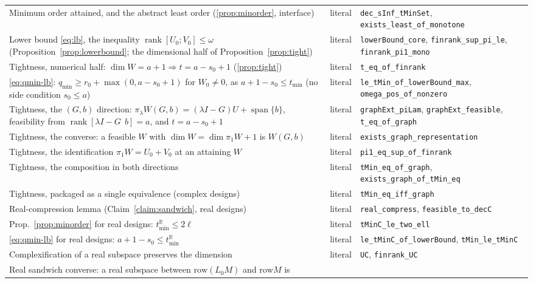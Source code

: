 ﻿\documentclass[journal]{IEEEtran}
\theoremstyle{plainn}
\theoremstyle{remark}
\begin{document}
\begin{table}[!t]
\begin{tabular}{@{}p{}>{\raggedright\arraybackslash}p{}>{\raggedright\arraybackslash}p{}@{}}
Minimum order attained, and the abstract least order (\ref{prop:minorder}, interface) & literal &
\texttt{dec\_sInf\_tMinSet}, \texttt{exists\_least\_of\_monotone} \\
Lower bound \eqref{eq:lb}, the inequality $\operatorname{rank}[U_0;V_0]\le\omega$
(Proposition~\ref{prop:lowerbound}; the dimensional half of Proposition~\ref{prop:tight}) &
literal & \texttt{lowerBound\_core}, \texttt{finrank\_sup\_pi\_le}, \texttt{finrank\_pi1\_mono} \\
Tightness, numerical half: $\dim W=a+1\Rightarrow t=a-s_0+1$ (\ref{prop:tight}) & literal &
\texttt{t\_eq\_of\_finrank} \\
\eqref{eq:qmin-lb}: $q_{\min}\ge r_0+\max(0,a-s_0+1)$ for $W_0\neq0$, as
$a+1-s_0\le t_{\min}$ (no side condition $s_0\le a$) & literal &
\texttt{le\_tMin\_of\_lowerBound\_max}, \texttt{omega\_pos\_of\_nonzero} \\
Tightness, the $(G,b)$ direction: $\pi_\lambda W(G,b)=(\lambda I-G)U+\operatorname{span}\{b\}$,
feasibility from $\operatorname{rank}[\lambda I-G\ \ b]=a$, and $t=a-s_0+1$ & literal &
\texttt{graphExt\_piLam}, \texttt{graphExt\_feasible}, \texttt{t\_eq\_of\_graph} \\
Tightness, the converse: a feasible $W$ with $\dim W=\dim\pi_1W+1$ is $W(G,b)$ & literal &
\texttt{exists\_graph\_representation} \\
Tightness, the identification $\pi_1W=U_0+V_0$ at an attaining $W$ & literal &
\texttt{pi1\_eq\_sup\_of\_finrank} \\
Tightness, the composition in both directions & literal &
\texttt{tMin\_eq\_of\_graph}, \texttt{exists\_graph\_of\_tMin\_eq} \\
Tightness, packaged as a single equivalence (complex designs) & literal &
\texttt{tMin\_eq\_iff\_graph} \\
Real-compression lemma (Claim~\ref{claim:sandwich}, real designs) & literal &
\texttt{real\_compress}, \texttt{feasible\_to\_decC} \\
Prop.~\ref{prop:minorder} for real designs: $t_{\min}^{\mathbb R}\le2\ell$ & literal &
\texttt{tMinC\_le\_two\_ell} \\
\eqref{eq:qmin-lb} for real designs: $a+1-s_0\le t_{\min}^{\mathbb R}$ & literal &
\texttt{le\_tMinC\_of\_lowerBound}, \texttt{tMin\_le\_tMinC} \\
Complexification of a real subspace preserves the dimension & literal &
\texttt{UC}, \texttt{finrank\_UC} \\
Real sandwich converse: a real subspace between $\mathrm{row}(L_0M)$ and $\mathrm{row}M$ is

\end{tabular}
\end{table}
\end{document}
